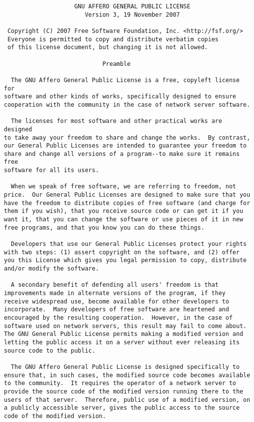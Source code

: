 \begin{lstlisting}
                    GNU AFFERO GENERAL PUBLIC LICENSE
                       Version 3, 19 November 2007

 Copyright (C) 2007 Free Software Foundation, Inc. <http://fsf.org/>
 Everyone is permitted to copy and distribute verbatim copies
 of this license document, but changing it is not allowed.

                            Preamble

  The GNU Affero General Public License is a free, copyleft license for
software and other kinds of works, specifically designed to ensure
cooperation with the community in the case of network server software.

  The licenses for most software and other practical works are designed
to take away your freedom to share and change the works.  By contrast,
our General Public Licenses are intended to guarantee your freedom to
share and change all versions of a program--to make sure it remains free
software for all its users.

  When we speak of free software, we are referring to freedom, not
price.  Our General Public Licenses are designed to make sure that you
have the freedom to distribute copies of free software (and charge for
them if you wish), that you receive source code or can get it if you
want it, that you can change the software or use pieces of it in new
free programs, and that you know you can do these things.

  Developers that use our General Public Licenses protect your rights
with two steps: (1) assert copyright on the software, and (2) offer
you this License which gives you legal permission to copy, distribute
and/or modify the software.

  A secondary benefit of defending all users' freedom is that
improvements made in alternate versions of the program, if they
receive widespread use, become available for other developers to
incorporate.  Many developers of free software are heartened and
encouraged by the resulting cooperation.  However, in the case of
software used on network servers, this result may fail to come about.
The GNU General Public License permits making a modified version and
letting the public access it on a server without ever releasing its
source code to the public.

  The GNU Affero General Public License is designed specifically to
ensure that, in such cases, the modified source code becomes available
to the community.  It requires the operator of a network server to
provide the source code of the modified version running there to the
users of that server.  Therefore, public use of a modified version, on
a publicly accessible server, gives the public access to the source
code of the modified version.


\end{lstlisting}
